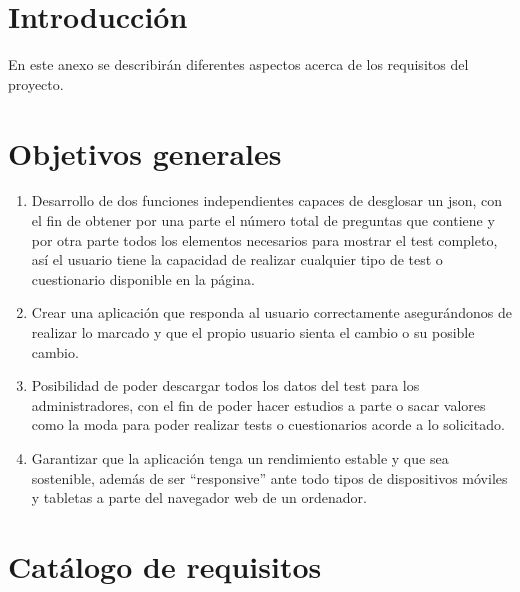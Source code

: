 
\section{Introducción}

En este anexo se describirán diferentes aspectos acerca de los requisitos del proyecto.

\section{Objetivos generales}
\begin{enumerate}
    \item Desarrollo de dos funciones independientes capaces de desglosar un json, con el fin de obtener por una parte el número total de preguntas que contiene y por otra parte todos los elementos necesarios para mostrar el test completo, así el usuario tiene la capacidad de realizar cualquier tipo de test o cuestionario disponible en la página.
    \item Crear una aplicación que responda al usuario correctamente asegurándonos de realizar lo marcado y que el propio usuario sienta el cambio o su posible cambio.  
    \item Posibilidad de poder descargar todos los datos del test para los administradores, con el fin de poder hacer estudios a parte o sacar valores como la moda para poder realizar tests o cuestionarios acorde a lo solicitado.
    \item Garantizar que la aplicación tenga un rendimiento estable y que sea sostenible, además de ser “responsive” ante todo tipos de dispositivos móviles y tabletas a parte del navegador web de un ordenador.
\end{enumerate}
\section{Catálogo de requisitos}
